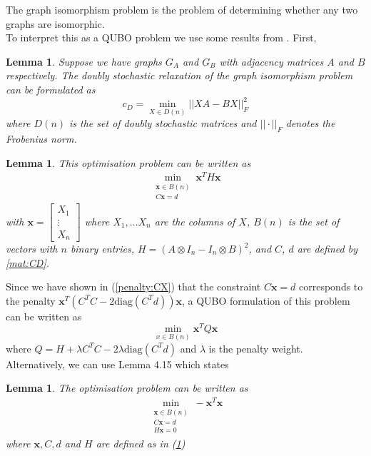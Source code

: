 \documentclass{article}
\newtheorem{lem}[prop]{Lemma}
\begin{document}
\noindent The graph isomorphism problem is the problem of determining whether any two graphs are isomorphic.\\

\noindent To interpret this as a QUBO problem we use some results from \autocite{klus2023continuous}. First,\\

\begin{lem}\label{lem:StochasticIso}
\cite[p.~6]{klus2023continuous} Suppose we have graphs \(G_A\) and \(G_B\) with adjacency matrices \(A\) and \(B\) respectively. The doubly stochastic relaxation of the graph isomorphism problem can be formulated as
\begin{equation*}
    c_D = \min_{X \in D(n)} ||XA - BX||^2_F
\end{equation*}
where \(D(n)\) is the set of doubly stochastic matrices and \(||\cdot||_F\) denotes the Frobenius norm.
\end{lem}

\begin{lem}\label{lem:qubo1}
    \cite[p.~8]{klus2023continuous} This optimisation problem can be written as \begin{align*}
    \min_{\substack{\mathbf{x} \in B(n) \\ C\mathbf{x} = d}} \mathbf{x}^T H\mathbf{x}
    \end{align*}
    with \(\mathbf{x} = \begin{bmatrix}
        X_1 \\
        \vdots \\
        X_n
    \end{bmatrix}\) where \(X_1, \dots X_n\) are the columns of \(X\), \(B(n)\) is the set of vectors with \(n\) binary entries, \(H = (A \otimes I_n - I_n \otimes B)^2\), and \(C\), \(d\) are defined by \ref{mat:CD}.
\end{lem}

\noindent Since we have shown in (\ref{penalty:CX}) that the constraint \(C\mathbf{x} = d\) corresponds to the penalty \(\mathbf{x}^T(C^T C - 2\text{diag}(C^T d))\mathbf{x}\), a QUBO formulation of this problem can be written as 
\begin{equation}\label{QUBO: graphIso1}
	\min_{x \in B(n)} \mathbf{x}^T Q \mathbf{x}
\end{equation}
where \(Q = H + \lambda C^T C - 2\lambda\text{diag}(C^T d)\) and \(\lambda\) is the penalty weight.\\

\noindent Alternatively, we can use Lemma 4.15 which states
\begin{lem}
	\cite[p.~13]{klus2023continuous} The optimisation problem can be written as \begin{align*}
		\min_{\substack{\mathbf{x} \in B(n) \\ C\mathbf{x} = d \\ H\mathbf{x}=0}} -\mathbf{x}^T\mathbf{x}
	\end{align*}
	where \(\mathbf{x}, C, d\) and \(H\) are defined as in (\ref{lem:qubo1})
\end{lem}
\end{document}
